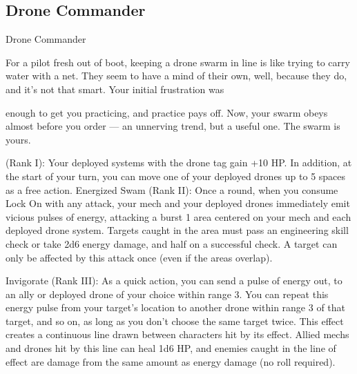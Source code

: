 \subsection{Drone Commander}


                                           Drone Commander  

For a pilot fresh out of boot, keeping a drone swarm in line is like trying to carry water with a net. They  
seem to have a mind of their own, well, because they do, and it’s not that smart. Your initial frustration was  

enough to get you practicing, and practice pays off. Now, your swarm obeys almost before you order — an  
unnerving trend, but a useful one. The swarm is yours.   

(Rank I): Your deployed systems with the drone tag gain +10 HP. In addition, at the start of your  
turn, you can move one of your deployed drones up to 5 spaces as a free action.  
Energized Swam (Rank II): Once a round, when you consume Lock On with any attack, your  
mech and your deployed drones immediately emit vicious pulses of energy, attacking a burst 1  
area centered on your mech and each deployed drone system. Targets caught in the area must  
pass an engineering skill check or take 2d6 energy damage, and half on a successful check. A  
target can only be affected by this attack once (even if the areas overlap).
 
Invigorate (Rank III): As a quick action, you can send a pulse of energy out, to an ally or  
deployed drone of your choice within range 3. You can repeat this energy pulse from your  
target’s location to another drone within range 3 of that target, and so on, as long as you don’t  
choose the same target twice. This effect creates a continuous line drawn between characters hit  
by its effect. Allied mechs and drones hit by this line can heal 1d6 HP, and enemies caught in the  
line of effect are damage from the same amount as energy damage (no roll required).